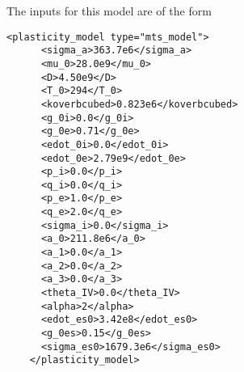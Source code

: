   The inputs for this model are of the form
  \begin{Verbatim}[fontsize=\footnotesize]
    <plasticity_model type="mts_model">
      <sigma_a>363.7e6</sigma_a>
      <mu_0>28.0e9</mu_0>
      <D>4.50e9</D>
      <T_0>294</T_0>
      <koverbcubed>0.823e6</koverbcubed>
      <g_0i>0.0</g_0i>
      <g_0e>0.71</g_0e>
      <edot_0i>0.0</edot_0i>
      <edot_0e>2.79e9</edot_0e>
      <p_i>0.0</p_i>
      <q_i>0.0</q_i>
      <p_e>1.0</p_e>
      <q_e>2.0</q_e>
      <sigma_i>0.0</sigma_i>
      <a_0>211.8e6</a_0>
      <a_1>0.0</a_1>
      <a_2>0.0</a_2>
      <a_3>0.0</a_3>
      <theta_IV>0.0</theta_IV>
      <alpha>2</alpha>
      <edot_es0>3.42e8</edot_es0>
      <g_0es>0.15</g_0es>
      <sigma_es0>1679.3e6</sigma_es0>
    </plasticity_model>
  \end{Verbatim}

